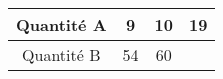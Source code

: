 \begin{tabular}{|c|c|c|c|}
\hline
Quantité A & 9 & 10 & 19 \\ \hline
Quantité B & 54 & 60 & \kern1cm \\ \hline
\end{tabular}

